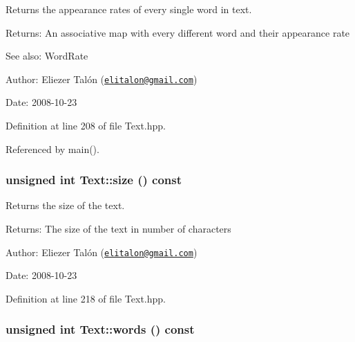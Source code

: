Returns the appearance rates of every single word in text. 

\begin{Desc}
\item[Returns:]An associative map with every different word and their appearance rate\end{Desc}
\begin{Desc}
\item[See also:]WordRate\end{Desc}
\begin{Desc}
\item[Author:]Eliezer Talón (\href{mailto:elitalon@gmail.com}{\tt elitalon@gmail.com}) \end{Desc}
\begin{Desc}
\item[Date:]2008-10-23 \end{Desc}


Definition at line 208 of file Text.hpp.

Referenced by main().\hypertarget{class_text_b66729ba84c2698ed888f641b3838a8b}{
\subsubsection[size]{\setlength{\rightskip}{0pt plus 5cm}unsigned int Text::size () const}}
\label{class_text_b66729ba84c2698ed888f641b3838a8b}


Returns the size of the text. 

\begin{Desc}
\item[Returns:]The size of the text in number of characters\end{Desc}
\begin{Desc}
\item[Author:]Eliezer Talón (\href{mailto:elitalon@gmail.com}{\tt elitalon@gmail.com}) \end{Desc}
\begin{Desc}
\item[Date:]2008-10-23 \end{Desc}


Definition at line 218 of file Text.hpp.\hypertarget{class_text_edfd71af7802a2d72eed7365f081a66d}{
\subsubsection[words]{\setlength{\rightskip}{0pt plus 5cm}unsigned int Text::words () const}}
\label{class_text_edfd71af7802a2d72eed7365f081a66d}


